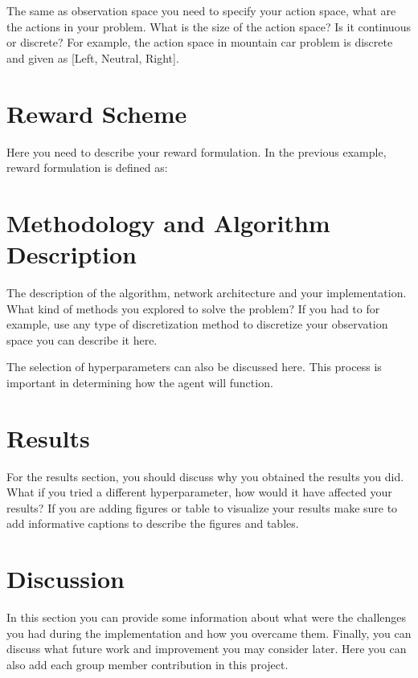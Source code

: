 \documentclass{article}
\begin{document}
The same as observation space you need to specify your action space, what are the actions in your problem. What is the size of the action space? Is it continuous or discrete? For example, the action space in mountain car problem is discrete and given as [Left, Neutral, Right]. 

\section{Reward Scheme}

Here you need to describe your reward formulation. In the previous example, reward formulation is defined as:

\section{Methodology and Algorithm Description}

The description of the algorithm, network architecture and your implementation. What kind of methods you explored to solve the problem? If you had to for example, use any type of discretization method to discretize your observation space you can describe it here.

The selection of hyperparameters can also be discussed here. This process is important in determining how the agent will function.

\section{Results}

For the results section, you should discuss why you obtained the results you did. What if you tried a different hyperparameter, how would it have affected your results?
If you are adding figures or table to visualize your results make sure to add informative captions to describe the figures and tables. 

\section{Discussion}

In this section you can provide some information about what were the challenges you had during the implementation and how you overcame them. Finally, you can discuss what future work and improvement you may consider later.
Here you can also add each group member contribution in this project. 
\end{document}
